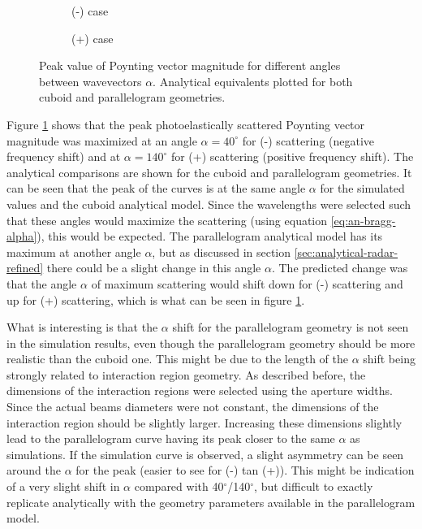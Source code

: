 \documentclass[11pt,twoside]{eitExjobb}
\begin{document}
	\begin{figure}[H]
		\centering
		\begin{subfigure}{\textwidth}
			\resizebox{\textwidth}{!}{
				
			}
			\caption{(-) case}
		\end{subfigure}
		\begin{subfigure}{\textwidth}
			\resizebox{\textwidth}{!}{
				
			}
			\caption{(+) case}
		\end{subfigure}
		\caption{\label{fig:res-angle-sweep-peak} Peak value of Poynting vector magnitude for different angles between wavevectors $\alpha$. Analytical equivalents plotted for both cuboid and parallelogram geometries.}
	\end{figure}
	Figure \ref{fig:res-angle-sweep-peak} shows that the peak photoelastically scattered Poynting vector magnitude was maximized at an angle $\alpha = 40^\circ$ for (-) scattering (negative frequency shift) and at $\alpha = 140^\circ$ for (+) scattering (positive frequency shift). The analytical comparisons are shown for the cuboid and parallelogram geometries. It can be seen that the peak of the curves is at the same angle $\alpha$ for the simulated values and the cuboid analytical model. Since the wavelengths were selected such that these angles would maximize the scattering (using equation \eqref{eq:an-bragg-alpha}), this would be expected. The parallelogram analytical model has its maximum at another angle $\alpha$, but as discussed in section \ref{sec:analytical-radar-refined} there could be a slight change in this angle $\alpha$. The predicted change was that the angle $\alpha$ of maximum scattering would shift down for (-) scattering and up for (+) scattering, which is what can be seen in figure \ref{fig:res-angle-sweep-peak}.
	
	What is interesting is that the $\alpha$ shift for the parallelogram geometry is not seen in the simulation results, even though the parallelogram geometry should be more realistic than the cuboid one. This might be due to the length of the $\alpha$ shift being strongly related to interaction region geometry. As described before, the dimensions of the interaction regions were selected using the aperture widths. Since the actual beams diameters were not constant, the dimensions of the interaction region should be slightly larger. Increasing these dimensions slightly lead to the parallelogram curve having its peak closer to the same $\alpha$ as simulations. If the simulation curve is observed, a slight asymmetry can be seen around the $\alpha$ for the peak (easier to see for (-) tan (+)). This might be indication of a very slight shift in $\alpha$ compared with 40$^\circ$/140$^\circ$, but difficult to exactly replicate analytically with the geometry parameters available in the parallelogram model.
	
\end{document}
